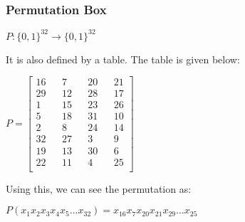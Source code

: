 \documentclass[11pt]{article}
\begin{document}
\subsubsection{Permutation Box}
\begin{center}
    $P: \{0, 1\}^{32} \rightarrow \{0, 1\}^{32}$\\
\end{center}
It is also defined by a table. The table is given below:
\begin{center}
    $ P = 
    \begin{bmatrix}
        16 && 7 && 20 && 21\\
        29 && 12 && 28 && 17\\
        1 && 15 && 23 && 26\\
        5 && 18 && 31 && 10\\
        2 && 8 && 24 && 14\\
        32 && 27 && 3 && 9\\
        19 && 13 && 30 && 6\\
        22 && 11 && 4 && 25\\
    \end{bmatrix}$
\end{center}
Using this, we can see the permutation as:
\begin{center}
    $P(x_1x_2x_3x_4x_5...x_{32}) = x_{16}x_7x_{20}x_{21}x_{29}...x_{25}$
\end{center}
\end{document}
